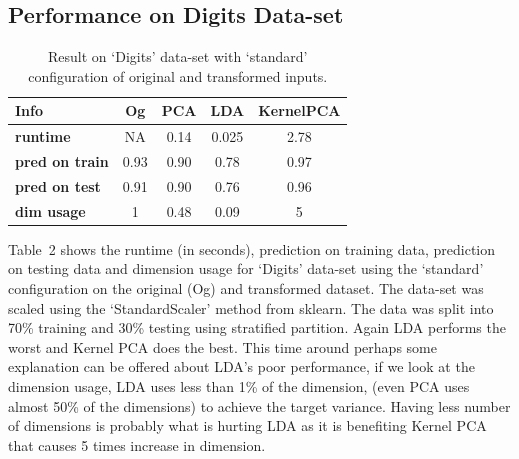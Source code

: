 \documentclass[12pt]{article}
\begin{document}
\subsection*{Performance on Digits Data-set}

\begin{table}[!hptb]
\centering
\begin{tabular}{|l|c|c|c|c|}
\hline
\textbf{Info} & \textbf{Og} & \textbf{PCA} & \textbf{LDA} & \textbf{KernelPCA} \\\hline
\textbf{runtime} & NA & 0.14 & 0.025 & 2.78\\
\textbf{pred on train} & 0.93 & 0.90 &  0.78 & 0.97 \\
\textbf{pred on test} & 0.91 & 0.90 & 0.76 & 0.96 \\
\textbf{dim usage} & 1 & 0.48 & 0.09 & 5 \\\hline
\end{tabular}
\caption{Result on `Digits' data-set with `standard' configuration of original and transformed inputs.}
\end{table}

Table~2 shows the runtime (in seconds), prediction on training data, prediction on testing data and dimension usage for `Digits' data-set using the `standard' configuration on the original (Og) and transformed dataset. The data-set was scaled using the `StandardScaler' method from sklearn. The data was split into 70\% training and 30\% testing using stratified partition. Again LDA performs the worst and Kernel PCA does the best. This time around perhaps some explanation can be offered about LDA's poor performance, if we look at the dimension usage, LDA uses less than 1\% of the dimension, (even PCA uses almost 50\% of the dimensions) to achieve the target variance. Having less number of dimensions is probably what is hurting LDA as it is benefiting Kernel PCA that causes 5 times increase in dimension.
\end{document}
